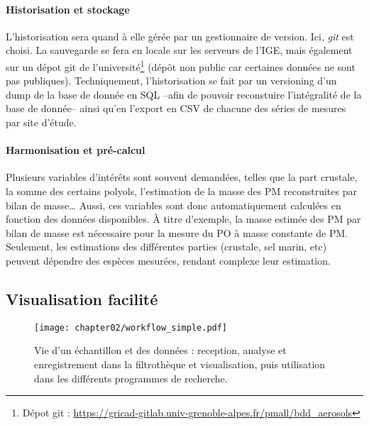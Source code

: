 \paragraph{Historisation et stockage}%
\label{par:historisation_et_stockage}

L'historisation sera quand à elle gérée par un gestionnaire de version. Ici, \textit{git}
est choisi. La sauvegarde se fera en locale sur les serveurs de l'IGE, mais également sur
un dépot git de l'université\footnote{Dépot git :
\url{https://gricad-gitlab.univ-grenoble-alpes.fr/pmall/bdd_aerosols}} (dépôt non public
car certaines données ne sont pas publiques).
Techniquement, l'historisation se fait par un versioning d'un dump de la base de donnée en
SQL --afin de pouvoir reconstuire l'intégralité de la base de donnée-- ainsi qu'en
l'export en CSV de chacune des séries de mesures par site d'étude.

\paragraph{Harmonisation et pré-calcul}%
\label{par:harmonisation_et_pré_calcul}

Plusieurs variables d'intérêts sont souvent demandées, telles que la part crustale, la
somme des certains polyols, l'estimation de la masse des PM reconstruites par bilan de
masse… Aussi, ces variables sont donc automatiquement calculées en fonction des données
disponibles. À titre d'exemple, la masse estimée des PM par bilan de masse est nécessaire
pour la mesure du PO à masse constante de PM. Seulement, les estimations des différentes
parties (crustale, sel marin, etc) peuvent dépendre des espèces mesurées, rendant complexe
leur estimation.

\subsection{Visualisation facilité}%
\label{sub:visualisation_facilité}




\begin{landscape}
\begin{figure}[ht]
    \centering
    \texttt{[image: chapter02/workflow\_simple.pdf]}
    \caption{Vie d'un échantillon et des données : reception, analyse et enregistrement
        dans la filtrothèque et visualisation, puis utilisation dans les différents
        programmes de recherche.}%
    \label{fig:bdd}
\end{figure}
\end{landscape}


